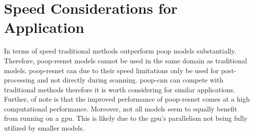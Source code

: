 \section{Speed Considerations for Application}
\label{ch:Discussion:Applications}

In terms of speed traditional methods outperform \ac{poop} models substantially. Therefore, \ac{poop}-\ac{resnet} models cannot be used in the same domain as traditional models. \Ac{poop}-\ac{resnet} can due to their speed limitations only be used for post-processing and not directly during scanning. \Ac{poop}-\ac{cnn} can compete with traditional methods therefore it is worth considering for similar applications. Further, of note is that the improved performance of \Ac{poop}-\ac{resnet} comes at a high computational performance. Moreover, not all models seem to equally benefit from running on a \ac{gpu}. This is likely due to the \ac{gpu}'s parallelism not being fully utilized by smaller models.

